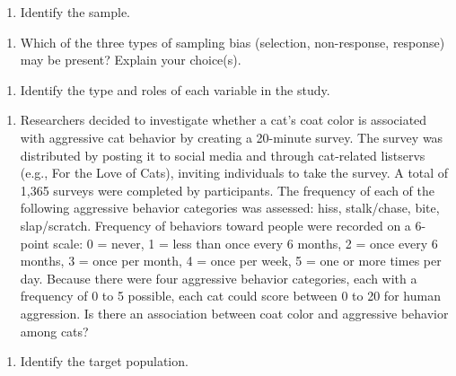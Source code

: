 \documentclass[
]{report}
\providecommand{\tightlist}{%
  \setlength{\itemsep}{0pt}\setlength{\parskip}{0pt}}
\begin{document}
\vspace{0.4in}

\begin{enumerate}
\def\labelenumi{\alph{enumi}.}
\setcounter{enumi}{1}
\tightlist
\item
  Identify the sample.
\end{enumerate}

\vspace{0.4in}

\begin{enumerate}
\def\labelenumi{\alph{enumi}.}
\setcounter{enumi}{2}
\tightlist
\item
  Which of the three types of sampling bias (selection, non-response, response) may be present? Explain your choice(s).
\end{enumerate}

\vspace{0.4in}

\begin{enumerate}
\def\labelenumi{\alph{enumi}.}
\setcounter{enumi}{3}
\tightlist
\item
  Identify the type and roles of each variable in the study.
\end{enumerate}

\vspace{0.6in}

\begin{enumerate}
\def\labelenumi{\arabic{enumi}.}
\setcounter{enumi}{3}
\tightlist
\item
  Researchers decided to investigate whether a cat's coat color is associated with aggressive cat behavior by creating a 20-minute survey. The survey was distributed by posting it to social media and through cat-related listservs (e.g., For the Love of Cats), inviting individuals to take the survey. A total of 1,365 surveys were completed by participants. The frequency of each of the following aggressive behavior categories was assessed: hiss, stalk/chase, bite, slap/scratch. Frequency of behaviors toward people were recorded on a 6-point scale: 0 = never, 1 = less than once every 6 months, 2 = once every 6 months, 3 = once per month, 4 = once per week, 5 = one or more times per day. Because there were four aggressive behavior categories, each with a frequency of 0 to 5 possible, each cat could score between 0 to 20 for human aggression. Is there an association between coat color and aggressive behavior among cats?
\end{enumerate}

\begin{enumerate}
\def\labelenumi{\alph{enumi}.}
\tightlist
\item
  Identify the target population.
\end{enumerate}
\end{document}
